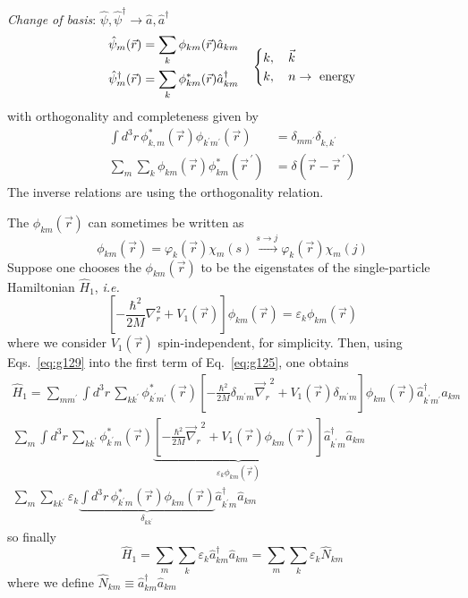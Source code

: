 \documentclass[12pt]{article}
\newcommand{\be}{\begin{equation}}
\newcommand{\ee}{\end{equation}}
\newcommand{\vecrp}{\ensuremath{\vec{r}^{\,\prime}}}
\newcommand{\vecnr}{\ensuremath{\vec{\nabla}_{\!r}}}
\begin{document}
\emph{Change of basis}: $\hat{\psi},\hat{\psi}^\dagger \to \hat{a},\hat{a}^\dagger$
\be
\begin{aligned}
\hat{\psi}_{m}(\vec{r})=\sum_{k} \phi_{k m}(\vec{r}) \hat{a}_{k m} \\ 
\hat{\psi}^\dagger_{m}(\vec{r})=\sum_{k} \phi_{k m}^{*}(\vec{r}) \hat{a}^\dagger_{k m}\end{aligned}
\\
\quad\left\{
\begin{aligned}
&k,\quad\vec{k}\\
&k,\quad n\to\text{ energy}
\end{aligned}
\right.
\label{eq:g129}
\ee
with orthogonality and completeness given by
\begin{align}
\int d^3 r\, \phi_{k, m}^{*}(\vec{r}) \phi_{k^{\prime} m^{\prime}}(\vec{r})&=\delta_{m m^{\prime}} \delta_{k, k^{\prime}}\\
\sum_{m} \sum_{k} \phi_{k m}(\vec{r}) \phi_{k m}^{*}\left(\vecrp\right)&=\delta\left(\vec{r}-\vecrp\right)
\end{align}
The inverse relations are using the orthogonality relation.

The $\phi_{k m}(\vec{r})$ can sometimes be written as
\be
\phi_{km}(\vec{r})=\varphi_{k}(\vec{r}) \chi_{m}(s) 
\stackrel{s \rightarrow j}{\longrightarrow} 
\varphi_{k}(\vec{r}) \chi_{m}(j)
\ee
Suppose one chooses the $\phi_{k m}(\vec{r})$ to be the eigenstates
of the single-particle Hamiltonian $\hat{H}_{1}$, \textit{i.e.}
\be
\left[-\frac{\hbar^{2}}{2 M} \nabla_{\!r}^{2}+V_{1}(\vec{r})\right] \phi_{k m}(\vec{r})=\varepsilon_{k} \phi_{k m}(\vec{r})
\ee
where we consider $V_1(\vec{r})$ spin-independent, for simplicity.
Then, using Eqs.~\eqref{eq:g129} into the first term of Eq.~\eqref{eq:g125}, one obtains
\be
\begin{gathered}
\hat{H}_1 = \sum_{mm^\prime} \int d^3r\, \sum_{kk^\prime}
\phi_{k^\prime m^\prime}^{*}(\vec{r})
\left[
-\frac{\hbar^{2}}{2 M} \delta_{m^{\prime} m} \vecnr^{2}+V_{1}(\vec{r}) \delta_{m^{\prime} m}
\right]
\phi_{km}(\vec{r}) \hat{a}^\dagger_{k^\prime m^\prime} \hat{a}_{k m}\\
%
\sum_{m} \int d^3r\, \sum_{kk^\prime}
\phi_{k^\prime m}^{*}(\vec{r})
\underbrace{\left[
-\frac{\hbar^{2}}{2 M} \vecnr^{2}+V_{1}(\vec{r}) \phi_{km}(\vec{r})
\right]}%
_{\varepsilon_k \phi_{km}(\vec{r})}
\hat{a}^\dagger_{k^\prime m} \hat{a}_{k m}\\
%
\sum_{m} \sum_{kk^\prime} \varepsilon_k 
\underbrace{\int d^3r\,\phi_{k^\prime m}^{*}(\vec{r})\phi_{km}(\vec{r})}%
_{\delta_{kk^\prime}}
\hat{a}^\dagger_{k^\prime m} \hat{a}_{k m}
\end{gathered}
\ee
so finally
\be
\hat{H}_{1}=
\sum_{m} \sum_{k} \varepsilon_{k} \hat{a}_{k m}^{\dagger} \hat{a}_{k m}=\sum_{m} \sum_{k} \varepsilon_{k} \hat{N}_{km}
\ee
where we define $\hat{N}_{km} \equiv \hat{a}_{k m}^{\dagger} \hat{a}_{k m}$
\end{document}
